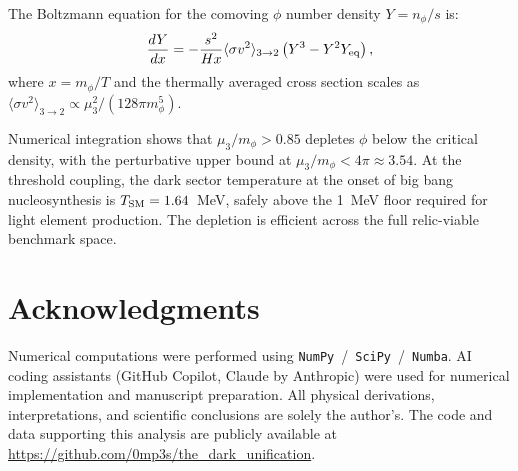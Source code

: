 \documentclass[12pt,a4paper]{article}
\begin{document}
The Boltzmann equation for the comoving $\phi$ number density $Y = n_\phi/s$ is:
\begin{equation}
  \frac{dY}{dx} = -\frac{s^2}{Hx}\langle\sigma v^2\rangle_{3\to2}
  \left(Y^3 - Y^2 Y_{\rm eq}\right),
\end{equation}
where $x = m_\phi/T$ and the thermally averaged cross section scales as
$\langle\sigma v^2\rangle_{3\to2} \propto \mu_3^2/(128\pi m_\phi^5)$.

Numerical integration shows that $\mu_3/m_\phi > 0.85$ depletes $\phi$
below the critical density, with the perturbative upper bound at
$\mu_3/m_\phi < 4\pi \approx 3.54$. At the threshold coupling,
the dark sector temperature at the onset of big bang nucleosynthesis is
$T_{\rm SM} = 1.64$~MeV, safely above the 1~MeV floor required for
light element production. The depletion is efficient across the full
relic-viable benchmark space.

\section*{Acknowledgments}
Numerical computations were performed using
\texttt{NumPy}~/~\texttt{SciPy}~/~\texttt{Numba}.
AI coding assistants (GitHub Copilot, Claude by Anthropic) were used
for numerical implementation and manuscript preparation.
All physical derivations, interpretations, and scientific conclusions
are solely the author's.
The code and data supporting this analysis are publicly available at
\url{https://github.com/0mp3s/the_dark_unification}.



\end{document}
